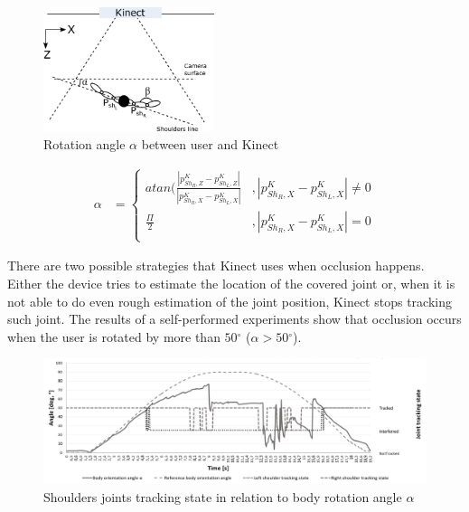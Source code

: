 \documentclass[sensors,article,submit,moreauthors,pdftex,10pt,a4paper]{mdpi}
\newcommand{\degree}{\ensuremath{{}^{\circ}}\xspace}
\begin{document}
\begin{figure}[H]
	\centering
	\includegraphics[width=5cm]{Figure3.png}
	\caption{Rotation angle $\alpha$ between user and Kinect}
	\label{fig:kinect:rotationAngle}
\end{figure}

\begin{equation}
	\label{eq:kinect:bodyRotationAngle}
	\begin{split}
		\alpha &= 
		\begin{cases} 
			atan(\frac{|p^K_{{Sh}_R,Z} - p^K_{{Sh}_L,Z}|}{|p^K_{{Sh}_R,X} - p^K_{{Sh}_L,X}|} & , |p^K_{{Sh}_R,X} - p^K_{{Sh}_L,X}| \neq 0 \\
			\frac{\Pi}{2}                                                                    & , |p^K_{{Sh}_R,X} - p^K_{{Sh}_L,X}| = 0    \\		
		\end{cases}
	\end{split}
\end{equation}

There are two possible strategies that Kinect uses when occlusion happens. Either the device tries to estimate the location of the covered joint or, when it is not able to do even rough estimation of the joint position, Kinect stops tracking such joint. The results of a self-performed experiments show that occlusion occurs when the user is rotated by more than $50\degree$ ($\alpha > 50\degree$). 

\begin{figure}[H]
	\centering
	\includegraphics[width=12cm]{Figure4.png}
	\caption{Shoulders joints tracking state in relation to body rotation angle $\alpha$}
	\label{fig:kinect:trackingVsAlpha}
\end{figure}
\end{document}
